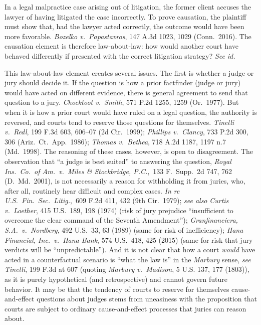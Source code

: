 \documentclass[
  12pt,
  letterpaper,
]{scrartcl}
\begin{document}
In a legal malpractice case arising out of litigation, the former client
accuses the lawyer of having litigated the case incorrectly. To prove
causation, the plaintiff must show that, had the lawyer acted correctly, the
outcome would have been more favorable. \textit{Bozelko v.~Papastavros}, 147
A.3d 1023, 1029 (Conn.~2016). The causation element is therefore law-about-law:
how would another court have behaved differently if presented with the correct
litigation strategy? \textit{See} \textit{id.}

This law-about-law element creates several issues. The first is whether a judge
or jury should decide it. If the question is how a prior factfinder (judge or
jury) would have acted on different evidence, there is general agreement to
send that question to a jury. \textit{Chocktoot v.~Smith}, 571 P.2d 1255, 1259
(Or.~1977). But when it is how a prior court would have ruled on a legal
question, the authority is reversed, and courts tend to reserve those questions
for themselves. \textit{Tinelli v.~Redl}, 199 F.3d 603, 606--07 (2d Cir.~1999);
\textit{Phillips v.~Clancy}, 733 P.2d 300, 306 (Ariz.~Ct.~App.~1986);
\textit{Thomas v.~Bethea}, 718 A.2d 1187, 1197 n.7 (Md.~1998). The reasoning of
these cases, however, is open to disagreement. The observation that ``a judge
is best suited'' to answering the question, \textit{Royal Ins.~Co.~of
Am.~v.~Miles \& Stockbridge, P.C.},~133 F.~Supp.~2d 747, 762 (D.~Md.~2001), is
not necessarily a reason for withholding it from juries, who, after all,
routinely hear difficult and complex cases. \textit{In re
U.S.~Fin.~Sec.~Litig.},~609 F.2d 411, 432 (9th Cir.~1979); \textit{see also}
\textit{Curtis v.~Loether}, 415 U.S.~189, 198 (1974) (risk of jury prejudice
``insufficient to overcome the clear command of the Seventh Amendment'');
\textit{Granfinanciera, S.A.~v.~Nordberg}, 492 U.S.~33, 63 (1989) (same for
risk of inefficiency); \textit{Hana Financial, Inc.~v.~Hana Bank}, 574
U.S.~418, 425 (2015) (same for risk that jury verdicts will be
``unpredictable''). And it is not clear that how a court \emph{would} have
acted in a counterfactual scenario is ``what the law is'' in the
\textit{Marbury} sense, \textit{see} \textit{Tinelli}, 199 F.3d at 607 (quoting
\textit{Marbury v.~Madison}, 5 U.S. 137, 177 (1803)), as it is purely
hypothetical (and retrospective) and cannot govern future behavior. It may be
that the tendency of courts to reserve for themselves cause-and-effect
questions about judges stems from uneasiness with the proposition that courts
are subject to ordinary cause-and-effect processes that juries can reason
about.
\end{document}
